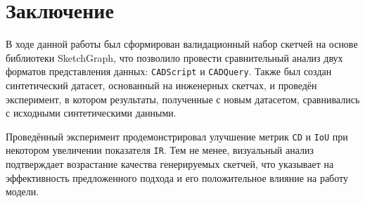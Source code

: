 \section{Заключение}
\label{sec:Chapter4} 

В ходе данной работы был сформирован валидационный набор скетчей на основе библиотеки SketchGraph, что позволило провести сравнительный анализ двух форматов представления данных: \texttt{CADScript} и \texttt{CADQuery}. Также был создан синтетический датасет, основанный на инженерных скетчах, и проведён эксперимент, в котором результаты, полученные с новым датасетом, сравнивались с исходными синтетическими данными.

Проведённый эксперимент продемонстрировал улучшение метрик \texttt{CD} и \texttt{IoU} при некотором увеличении показателя \texttt{IR}. Тем не менее, визуальный анализ подтверждает возрастание качества генерируемых скетчей, что указывает на эффективность предложенного подхода и его положительное влияние на работу модели.

\newpage

